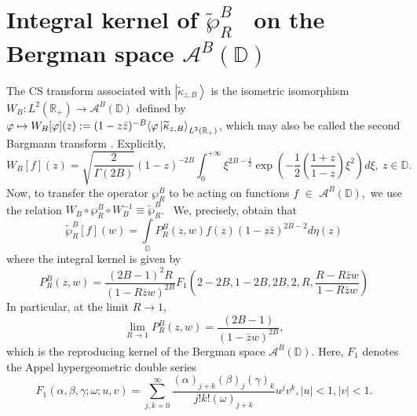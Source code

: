 \section{\textbf{Integral kernel of $\widetilde{\wp }_{R}^{B}$ \ on the Bergman
space $\mathcal{A}^{B}(\mathbb{D})$}}

The CS transform associated with $\left\vert \widetilde{\kappa }%
_{z,B}\right\rangle $ is the isometric isomorphism $W_{B}:L^{2}(\mathbb{R}%
_{+})\rightarrow \mathcal{A}^{B}(\mathbb{D})$ defined by $\varphi \mapsto
W_{B}[\varphi ](z):=(1-z\bar{z})^{-B}\langle \varphi \left\vert \widetilde{%
\kappa }_{z,B}\right\rangle _{L^{2}\left( \mathbb{R}_{+}\right) }$, which
may also be called the second Bargmann transform \cite{IWGM}.
Explicitly, 
\begin{equation}
\label{r5.1}
W_{B}[f](z)=\sqrt{\frac{2}{\Gamma (2B)}}(1-z)^{-2B}\int_{0}^{+\infty }\xi
^{2B-\frac{1}{2}}\exp \left( -\frac{1}{2}\left( \frac{1+z}{1-z}\right) \xi
^{2}\right) d\xi ,\ z\in \mathbb{D}.  
\end{equation}
Now, to transfer the operator $\wp _{R}^{B}$ to be acting on functions $f$ $%
\in $ $\mathcal{A}^{B}(\mathbb{D}),$ we use the relation $W_{B}\circ \wp
_{R}^{B}\circ W_{B}^{-1}\equiv \widetilde{\wp }_{R}^{B}$. \ We, precisely,
obtain that 
\begin{equation}
\label{r5.2}
\widetilde{\wp }_{R}^{B}[f](w)=\int\limits_{\mathbb{D}}P_{R}^{B}(z,w)f(z)(1-z%
\bar{z})^{2B-2}d\eta (z)  
\end{equation}
where the integral kernel is given by 
\begin{equation}
\label{r5.3}
P_{R}^{B}(z,w)=\frac{(2B-1)^{2}R}{(1-R\bar{z}w)^{2B}}F_{1}\left(
2-2B,1-2B,2B,2,R,\frac{R-R\bar{z}w}{1-R\bar{z}w}\right)  
\end{equation}
In particular, at the limit $R\rightarrow 1$, 
\begin{equation}
\label{r5.4}
\lim_{R\rightarrow 1}P_{R}^{B}(z,w)=\frac{(2B-1)}{\left( 1-\bar{z}w\right)
^{2B}},  
\end{equation}
which is the reproducing kernel of the Bergman space $\mathcal{A}^{B}(%
\mathbb{D}).$ Here, $F_{1}$ denotes the Appel hypergeometric double series%
\begin{equation*}
F_{1}\left( \alpha ,\beta ,\gamma ;\omega ;u,v\right)
=\sum\limits_{j,k=0}^{\infty }\frac{\left( \alpha \right) _{j+k}\left( \beta
\right) _{j}\left( \gamma \right) _{k}}{j!k!\left( \omega \right) _{j+k}}%
u^{j}v^{k},\left\vert u\right\vert <1,\left\vert v\right\vert <1.
\end{equation*}

